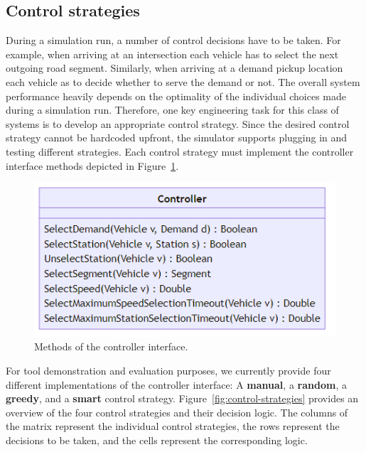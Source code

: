 \documentclass[a4paper,twoside]{article}
\begin{document}
	\subsection{Control strategies}
	\label{sec:controller-interface}
	
	
	During a simulation run, a number of control decisions have to be taken.
	For example, when arriving at an intersection each vehicle has to select the next outgoing road segment.
	Similarly, when arriving at a demand pickup location each vehicle as to decide whether to serve the demand or not.
	The overall system performance heavily depends on the optimality of the individual choices made during a simulation run.
	Therefore, one key engineering task for this class of systems is to develop an appropriate control strategy.
	Since the desired control strategy cannot be hardcoded upfront, the simulator supports plugging in and testing different strategies.
	Each control strategy must implement the controller interface methods depicted in Figure~\ref{fig:controller-interface}.
	
	\begin{figure}[!ht]
		\centering
		\includegraphics[scale=0.4]{../../diagrams/controller/classes-minimal.png}
		\caption{Methods of the controller interface.}
		\label{fig:controller-interface}
	\end{figure}
	
	For tool demonstration and evaluation purposes, we currently provide four different implementations of the controller interface: A \textbf{manual}, a \textbf{random}, a \textbf{greedy}, and a \textbf{smart} control strategy.
	Figure~\ref{fig:control-strategies} provides an overview of the four control strategies and their decision logic.
	The columns of the matrix represent the individual control strategies, the rows represent the decisions to be taken, and the cells represent the corresponding logic.
	
\end{document}
